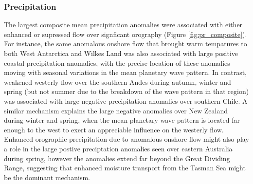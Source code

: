 \subsubsection{Precipitation}

The largest composite mean precipitation anomalies were associated with either enhanced or supressed flow over signficant orography (Figure \ref{fig:pr_composite}). For instance, the same anomalous onshore flow that brought warm tempatures to both West Antarctica and Wilkes Land was also associated with large positive coastal precipitation anomalies, with the precise location of these anomalies moving with seasonal variations in the mean planetary wave pattern. In contrast, weakened westerly flow over the southern Andes during autumn, winter and spring (but not summer due to the breakdown of the wave pattern in that region) was associated with large negative precipitation anomalies over southern Chile. A similar mechanism explains the large negative anomalies over New Zealand during winter and spring, when the mean planetary wave pattern is located far enough to the west to exert an appreciable influence on the westerly flow. Enhanced orographic precipitation due to anomalous onshore flow might also play a role in the large postive preciptation anomalies seen over eastern Australia during spring, however the anomalies extend far beyond the Great Dividing Range, suggesting that enhanced moisture transport from the Tasman Sea might be the dominant mechanism. 
